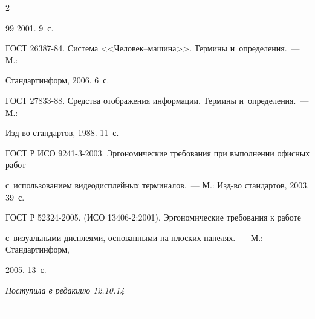 \begin{multicols}{2}
{{\begin{thebibliography}{99}
2001. 9~с.




ГОСТ 26387-84. Система <<Че\-ло\-век--ма\-ши\-на>>. Термины и~определения.~--- М.:

Стандартинформ, 2006. 6~с.


ГОСТ 27833-88. Средства отображения информации. Термины и~определения.~--- М.:

Изд-во стандартов, 1988. 11~с.




ГОСТ Р ИСО 9241-3-2003. Эргономические требования при выполнении офисных работ

с~использованием видеодисплейных терминалов.~--- М.: Изд-во стандартов, 2003. 39~с.




ГОСТ Р 52324-2005. (ИСО 13406-2:2001). Эргономические требования к работе

с~визуальными дисплеями, основанными на плоских панелях.~--- М.: Стандартинформ,

2005. 13~с.



 \end{thebibliography}



 }

 }



\end{multicols}



\vspace*{-6pt}



\hfill{\small\textit{Поступила в редакцию 12.10.14}}






\vspace*{12pt}



\hrule



\vspace*{2pt}



\hrule



